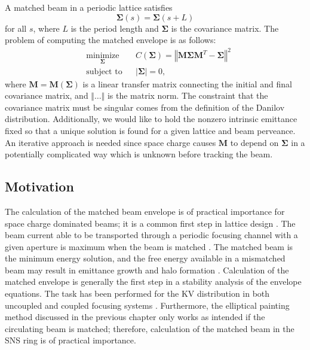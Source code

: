 A matched beam in a periodic lattice satisfies 
%
\begin{equation} \label{eq:matched_sigma}
    \bm{\Sigma}(s) = \bm{\Sigma}(s + L)
\end{equation}
%
for all $s$, where $L$ is the period length and $\bm{\Sigma}$ is the covariance matrix. The problem of computing the matched envelope is as follows:
%
\begin{equation}
\begin{aligned}
    & \underset{\bm{\Sigma}}{\text{minimize}}
    & & C(\bm{\Sigma}) = \left\Vert{\mathbf{M} \bm{\Sigma} \mathbf{M}^T - \bm{\Sigma}}\right\Vert^2 \\
    & \text{subject to}
    & & |\bm{\Sigma}| = 0,
\end{aligned}
\end{equation}
%
where $\mathbf{M} = \mathbf{M}(\bm{\Sigma})$ is a linear transfer matrix connecting the initial and final covariance matrix, and $\Vert\dots\Vert$ is the matrix norm. The constraint that the covariance matrix must be singular comes from the definition of the Danilov distribution. Additionally, we would like to hold the nonzero intrinsic emittance fixed so that a unique solution is found for a given lattice and beam perveance. An iterative approach is needed since space charge causes $\mathbf{M}$ to depend on $\bm{\Sigma}$ in a potentially complicated way which is unknown before tracking the beam. 


\subsection{Motivation}

The calculation of the matched beam envelope is of practical importance for space charge dominated beams; it is a common first step in lattice design \cite{Lund2006}. The beam current able to be transported through a periodic focusing channel with a given aperture is maximum when the beam is matched \cite{book:Reiser}. The matched beam is the minimum energy solution, and the free energy available in a mismatched beam may result in emittance growth and halo formation \cite{book:Reiser}. Calculation of the matched envelope is generally the first step in a stability analysis of the envelope equations. The task has been performed for the KV distribution in both uncoupled and coupled focusing systems \cite{Hofmann1983, Chernin1988, Ryne1995, Lund2006, Anderson2007, Goswami2016}. Furthermore, the elliptical painting method discussed in the previous chapter only works as intended if the circulating beam is matched; therefore, calculation of the matched beam in the SNS ring is of practical importance.

